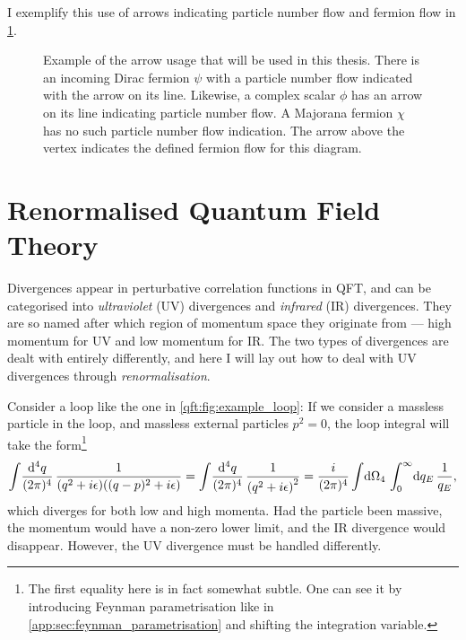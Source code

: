 \documentclass[../main.tex]{subfiles}
\begin{document}
I exemplify this use of arrows indicating particle number flow and fermion flow in \cref{qft:fig:feynman_flow}.

\begin{figure}[ht!]
  \centering
  \caption{Example of the arrow usage that will be used in this thesis.
    There is an incoming Dirac fermion \(\psi\) with a particle number flow indicated with the arrow on its line.
    Likewise, a complex scalar \(\phi\) has an arrow on its line indicating particle number flow.
    A Majorana fermion \(\chi\) has no such particle number flow indication.
    The arrow above the vertex indicates the defined fermion flow for this diagram.}
  \label{qft:fig:feynman_flow}
\end{figure}




\section{Renormalised Quantum Field Theory}
\label{qft:sec:renormalisation}



Divergences appear in perturbative correlation functions in QFT, and can be
categorised into \emph{ultraviolet} (UV) divergences and \emph{infrared} (IR)
divergences. They are so named after which region of momentum space they
originate from --- high momentum for UV and low momentum for IR\@. The two types
of divergences are dealt with entirely differently, and here I will lay out how
to deal with UV divergences through \emph{renormalisation}.
\medskip

Consider a loop like the one in \cref{qft:fig:example_loop}:
If we consider a massless particle in the loop, and massless external particles \(p^2 = 0\), the loop integral will take the form\footnote{The first equality here is in fact somewhat subtle. One can see it by introducing Feynman parametrisation like in \cref{app:sec:feynman_parametrisation} and shifting the integration variable.}
\begin{equation}
  \label{qft:eq:example_loop}
  \loopintegral[4]{q} \frac{1}{(q^2+i\epsilon)((q-p)^2+i\epsilon)} = \loopintegral[4]{q} \frac{1}{\pclosed{q^2 + i\epsilon}^2} =
  \frac{i}{(2\pi)^4} \integral{\Omega_4} \integral[_0^\infty]{q_E}
  \frac{1}{q_E},
\end{equation}
which diverges for both low and high momenta.  Had the particle been
massive, the momentum would have a non-zero lower limit, and the IR divergence
would disappear.
However, the UV divergence must be handled differently.
\end{document}
